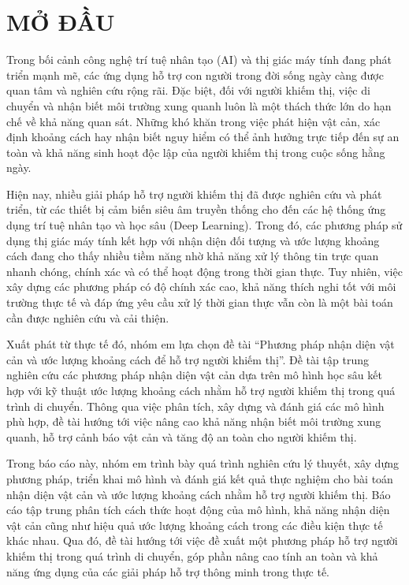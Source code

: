 
\chapter*{MỞ ĐẦU} %

\label{Chapter0} %


Trong bối cảnh công nghệ trí tuệ nhân tạo (AI) và thị giác máy tính đang phát triển
mạnh mẽ, các ứng dụng hỗ trợ con người trong đời sống ngày càng được quan tâm và
nghiên cứu rộng rãi. Đặc biệt, đối với người khiếm thị, việc di chuyển và nhận biết môi
trường xung quanh luôn là một thách thức lớn do hạn chế về khả năng quan sát. Những
khó khăn trong việc phát hiện vật cản, xác định khoảng cách hay nhận biết nguy hiểm
có thể ảnh hưởng trực tiếp đến sự an toàn và khả năng sinh hoạt độc lập của người
khiếm thị trong cuộc sống hằng ngày.

Hiện nay, nhiều giải pháp hỗ trợ người khiếm thị đã được nghiên cứu và phát triển,
từ các thiết bị cảm biến siêu âm truyền thống cho đến các hệ thống ứng dụng trí tuệ nhân
tạo và học sâu (Deep Learning). Trong đó, các phương pháp sử dụng thị giác máy tính
kết hợp với nhận diện đối tượng và ước lượng khoảng cách đang cho thấy nhiều tiềm
năng nhờ khả năng xử lý thông tin trực quan nhanh chóng, chính xác và có thể hoạt động
trong thời gian thực. Tuy nhiên, việc xây dựng các phương pháp có độ chính xác cao,
khả năng thích nghi tốt với môi trường thực tế và đáp ứng yêu cầu xử lý thời gian thực
vẫn còn là một bài toán cần được nghiên cứu và cải thiện.

Xuất phát từ thực tế đó, nhóm em lựa chọn đề tài “Phương pháp nhận diện vật cản và ước
lượng khoảng cách để hỗ trợ người khiếm thị”. Đề tài tập trung nghiên cứu các phương
pháp nhận diện vật cản dựa trên mô hình học sâu kết hợp với kỹ thuật ước lượng khoảng
cách nhằm hỗ trợ người khiếm thị trong quá trình di chuyển. Thông qua việc phân tích,
xây dựng và đánh giá các mô hình phù hợp, đề tài hướng tới việc nâng cao khả năng
nhận biết môi trường xung quanh, hỗ trợ cảnh báo vật cản và tăng độ an toàn cho người
khiếm thị.

Trong báo cáo này, nhóm em trình bày quá trình nghiên cứu lý thuyết, xây dựng phương
pháp, triển khai mô hình và đánh giá kết quả thực nghiệm cho bài toán nhận diện vật cản
và ước lượng khoảng cách nhằm hỗ trợ người khiếm thị. Báo cáo tập trung phân tích
cách thức hoạt động của mô hình, khả năng nhận diện vật cản cũng như hiệu quả ước
lượng khoảng cách trong các điều kiện thực tế khác nhau. Qua đó, đề tài hướng tới việc
đề xuất một phương pháp hỗ trợ người khiếm thị trong quá trình di chuyển, góp phần
nâng cao tính an toàn và khả năng ứng dụng của các giải pháp hỗ trợ thông minh trong
thực tế.